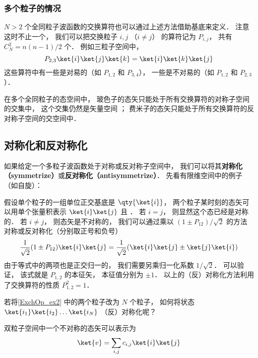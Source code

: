 \subsubsection{多个粒子的情况}
$N > 2$ 个全同粒子波函数的交换算符也可以通过上述方法借助基底来定义． 注意这时不止一个， 我们可以把交换粒子 $i,j$ （$i\ne j$） 的算符记为 $P_{i,j}$， 共有 $C_N^2 = n(n-1)/2$ 个． 例如三粒子空间中，
\begin{equation}
P_{2,3} \ket{i}\ket{j}\ket{k} = \ket{i}\ket{k}\ket{j}
\end{equation}
这些算符中有一些是对易的（如 $P_{1,2}$ 和 $P_{3,4}$）， 一些是不对易的（如 $P_{1,2}$ 和 $P_{2,3}$）．

在多个全同粒子的态空间中， 玻色子的态矢只能处于所有交换算符的对称子空间的交集中， 这个交集仍然是矢量空间%
； 费米子的态矢只能处于所有交换算符的反对称子空间的交空间中．

\subsection{对称化和反对称化}
如果给定一个多粒子波函数处于对称或反对称子空间中， 我们可以将其\textbf{对称化（symmetrize）}或\textbf{反对称化（antisymmetrize）}． 先看有限维空间中的例子（如自旋）：

\begin{example}{}\label{ExchOp_ex2}
假设单个粒子的一组单位正交基底是 $\qty{\ket{i}}$， 两个粒子某时刻的态矢可以用单个张量积表示 $\ket{i}\ket{j}$ 且 ． 若 $i = j$， 则显然这个态已经是对称的．  若 $i \ne j$， 则态矢是不对称的， 我们可以通过乘以 $(1 \pm P_{12})/\sqrt{2}$ 的方法对称或反对称化（分别取正号和负号）
\begin{equation}\label{ExchOp_eq5}
\frac{1}{\sqrt{2}}(1 \pm P_{12})\ket{i}\ket{j} = \frac{1}{\sqrt{2}}(\ket{i}\ket{j} \pm \ket{j}\ket{i})
\end{equation}
由于等式中的两项也是正交归一的， 我们需要另乘归一化系数 $1/\sqrt 2$． 可以验证， 该式就是 $P_{1,2}$ 的本征矢， 本征值分别为 $\pm 1$． 以上的（反）对称化方法利用了交换算符的性质 $P_{1,2}^2 = 1$．
\end{example}

\begin{example}{}
若将\autoref{ExchOp_ex2} 中的两个粒子改为 $N$ 个粒子， 如何将状态 $\ket{i_1}\ket{i_2}\dots\ket{i_N}$ （反）对称化呢？
\end{example}

双粒子空间中一个不对称的态矢可以表示为
\begin{equation}
\ket{v} = \sum_{i,j} c_{i,j} \ket{i}\ket{j}
\end{equation}


